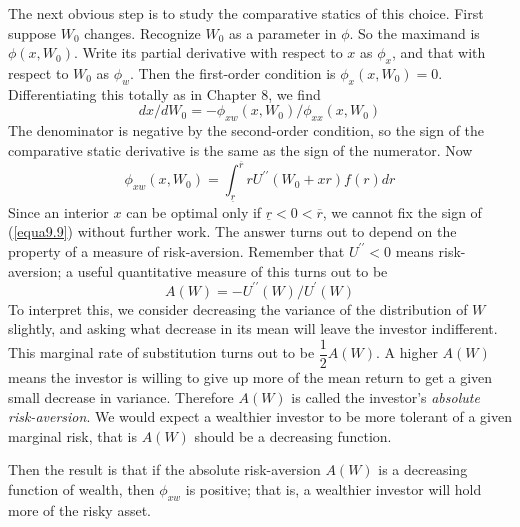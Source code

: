 The next obvious step is to study the comparative statics of this choice. First suppose $W_0$ changes. Recognize $W_0$ as a parameter in $\phi$. So the maximand is $\phi(x,W_0)$. Write its partial derivative with respect to $x$ as $\phi_x$, and that with respect to $W_0$ as $\phi_w$. Then the first-order condition is $\phi_x(x, W_0)=0$. Differentiating this totally as in Chapter 8, we find
\begin{equation*}
dx / dW_0 = - \phi_{xw}(x, W_0) / \phi_{xx}(x, W_0)
\end{equation*}
The denominator is negative by the second-order condition, so the sign of the comparative static derivative is the same as the sign of the numerator. Now
\begin{equation} \label{equa9.9}
\phi_{xw}(x,W_0) = \int_{\underline{r}}^{\overline{r}} r U^{\prime \prime}(W_0 +xr) f(r) dr
\end{equation}
Since an interior $x$ can be optimal only if $\underline{r} <0<\overline{r}$, we cannot fix the sign of (\ref{equa9.9}) without further work. The answer turns out to depend on the property of a measure of risk-aversion. Remember that $U^{\prime \prime}<0$ means risk-aversion; a useful quantitative measure of this turns out to be 
\begin{equation} \label{equa9.10}
A(W) = - U^{\prime \prime}(W) / U^\prime(W)
\end{equation}
To interpret this, we consider decreasing the variance of the distribution of $W$ slightly, and asking what decrease in its mean will leave the investor indifferent. This marginal rate of substitution turns out to be $\dfrac{1}{2} A(W)$. A higher $A(W)$ means the investor is willing to give up more of the mean return to get a given small decrease in variance. Therefore $A(W)$ is called the investor's \textit{absolute risk-aversion}. We would expect a wealthier investor to be more tolerant of a given marginal risk, that is $A(W)$ should be a decreasing function.

Then the result is that if the absolute risk-aversion $A(W)$ is a decreasing function of wealth, then $\phi_{xw}$ is positive; that is, a wealthier investor will hold more of the risky asset.

